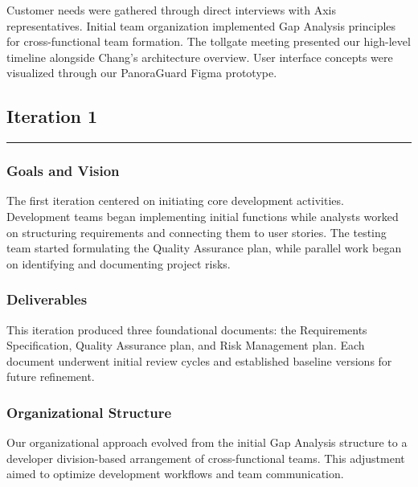 Customer needs were gathered through direct interviews with Axis representatives. Initial team organization implemented Gap Analysis principles for cross-functional team formation. The tollgate meeting presented our high-level timeline alongside Chang's architecture overview. User interface concepts were visualized through our PanoraGuard Figma prototype.

\subsection{Iteration 1}
\noindent\rule{\textwidth}{0.4pt}

\subsubsection*{Goals and Vision}
The first iteration centered on initiating core development activities. Development teams began implementing initial functions while analysts worked on structuring requirements and connecting them to user stories. The testing team started formulating the Quality Assurance plan, while parallel work began on identifying and documenting project risks.

\subsubsection*{Deliverables}
This iteration produced three foundational documents: the Requirements Specification, Quality Assurance plan, and Risk Management plan. Each document underwent initial review cycles and established baseline versions for future refinement.

\begin{center}
\noindent{}
\end{center}

\subsubsection*{Organizational Structure}
Our organizational approach evolved from the initial Gap Analysis structure to a developer division-based arrangement of cross-functional teams. This adjustment aimed to optimize development workflows and team communication.

